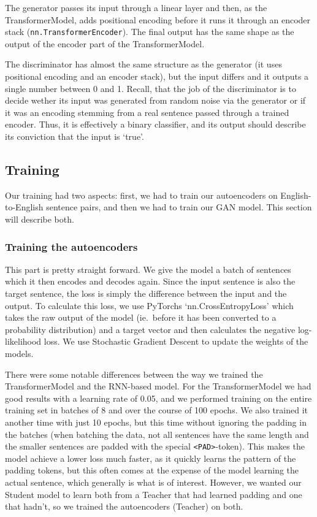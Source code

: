 \documentclass{article}
\begin{document}
The generator passes its input through a linear layer and then, as the
TransformerModel, adds positional encoding before it runs it through an encoder
stack (\texttt{nn.TransformerEncoder}). The final output has the same shape as
the output of the encoder part of the TransformerModel.

The discriminator has almost the same structure as the generator (it uses
positional encoding and an encoder stack), but the input differs and it outputs
a single number between 0 and 1. Recall, that the job of the discriminator is to
decide wether its input was generated from random noise via the generator or if
it was an encoding stemming from a real sentence passed through a trained
encoder. Thus, it is effectively a binary classifier, and its output should
describe its conviction that the input is `true'.

\subsection{Training}\label{sec:training}

Our training had two aspects: first, we had to train our autoencoders on
English-to-English sentence pairs, and then we had to train our GAN model. This
section will describe both.

\subsubsection{Training the autoencoders}

This part is pretty straight forward. We give the model a batch of sentences
which it then encodes and decodes again. Since the input sentence is also the
target sentence, the loss is simply the difference between the input and the
output. To calculate this loss, we use PyTorchs `nn.CrossEntropyLoss' which
takes the raw output of the model (ie.\ before it has been converted to a
probability distribution) and a target vector and then calculates the negative
log-likelihood loss. We use Stochastic Gradient Descent to update the weights of
the models.

There were some notable differences between the way we trained the
TransformerModel and the RNN-based model. For the TransformerModel we had good
results with a learning rate of 0.05, and we performed training on the entire
training set in batches of 8 and over the course of 100 epochs. We also trained
it another time with just 10 epochs, but this time without ignoring the padding
in the batches (when batching the data, not all sentences have the same length
and the smaller sentences are padded with the special \texttt{<PAD>}-token).
This makes the model achieve a lower loss much faster, as it quickly learns the
pattern of the padding tokens, but this often comes at the expense of the model
learning the actual sentence, which generally is what is of interest. However,
we wanted our Student model to learn both from a Teacher that had learned
padding and one that hadn't, so we trained the autoencoders (Teacher) on both.
\end{document}

